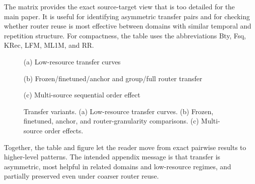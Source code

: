 \documentclass[sigconf,review,anonymous]{acmart}
\newcommand{\placeholderpanel}[1]{\fbox{\rule{0pt}{#1}\rule{0.92\linewidth}{0pt}}}
\begin{document}
The matrix provides the exact source-target view that is too detailed for the main paper. It is useful for identifying asymmetric transfer pairs and for checking whether router reuse is most effective between domains with similar temporal and repetition structure. For compactness, the table uses the abbreviations Bty, Fsq, KRec, LFM, ML1M, and RR.

\begin{figure}[t]
  \centering
  \begin{minipage}[t]{0.48\linewidth}
    \centering
    \placeholderpanel{1.05in}

    \vspace{0.35em}
    {\footnotesize (a) Low-resource transfer curves}
  \end{minipage}\hfill
  \begin{minipage}[t]{0.48\linewidth}
    \centering
    \placeholderpanel{1.05in}

    \vspace{0.35em}
    {\footnotesize (b) Frozen/finetuned/anchor and group/full router transfer}

  \end{minipage}

  \vspace{0.75em}

  \begin{minipage}[t]{\linewidth}
    \centering
    \placeholderpanel{1.15in}

    \vspace{0.35em}
    {\footnotesize (c) Multi-source sequential order effect}
  \end{minipage}
  \caption{Transfer variants. (a) Low-resource transfer curves. (b) Frozen, finetuned, anchor, and router-granularity comparisons. (c) Multi-source order effects.}
  \label{fig:appendix-transfer-panels}
\end{figure}

Together, the table and figure let the reader move from exact pairwise results to higher-level patterns. The intended appendix message is that transfer is asymmetric, most helpful in related domains and low-resource regimes, and partially preserved even under coarser router reuse.
\end{document}
